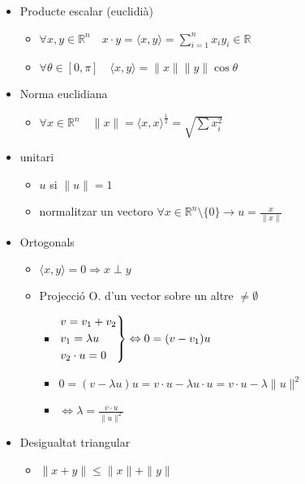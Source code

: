 \documentclass{article}
\newcommand{\R}{\mathbb{R}}
\newcommand{\prodEscalar}[2]{\langle#1, #2\rangle}
\begin{document}
\begin{itemize}
\item Producte escalar (euclidià)
	\begin{itemize}
	\item $ \forall x, y \in \R^n\quad x\cdot y = \prodEscalar{x}{y} = \sum_{i=1}^n x_iy_i \in \R$
	\item $ \forall \theta \in [0, \pi] \quad \prodEscalar{x}{y} = \|x\|\|y\| \cos{\theta}$
	\end{itemize}
\item Norma euclidiana
	\begin{itemize}
	\item $\forall x \in \R^n \quad \|x\| = \prodEscalar{x}{x}^{\frac{1}{2}} = \sqrt{\sum x_i^2}$
	\end{itemize}
\item unitari
	\begin{itemize}
	\item $u$ si $\|u\| = 1$
	\item normalitzar un vectoro
		\subitem $\forall x \in \R^n\setminus \{0\} \to u = \frac{x}{\|x\|}$
	\end{itemize}

\item Ortogonals
	\begin{itemize}
	\item $\prodEscalar{x}{y} = 0 \Rightarrow x \perp y$
	\item Projecció O. d'un vector sobre un altre $\neq \emptyset$
		\begin{itemize}
		\item
		$
		\begin{rcases}
		v = v_1 + v_2\\ v_1 = \lambda u \\ v_2 \cdot u = 0
		\end{rcases} \Leftrightarrow 0 = (v - v_1)u 
		$
		\item $0 = (v - \lambda u) u = v\cdot u - \lambda u\cdot u = v\cdot u - \lambda \|u\|^2$
		\item $\Leftrightarrow \lambda = \frac{v\cdot u}{\|u\|^2}$
		\end{itemize}
	\end{itemize}

\item Desigualtat triangular
	\begin{itemize}
	\item $\|x + y\| \le \|x\| + \|y\|$
	\end{itemize}


\end{itemize}
\end{document}
